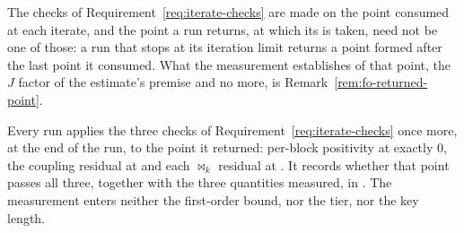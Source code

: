 
The checks of Requirement~\ref{req:iterate-checks} are made on the point
consumed at each iterate, and the point a run returns, at which its
 is taken, need not be one of those: a run that stops at its
iteration limit returns a point formed after the last point it consumed.
What the measurement establishes of that point, the $J$ factor of the
estimate's premise and no more, is Remark~\ref{rem:fo-returned-point}.

\begin{requirement}\label{req:returned-point-measured}
Every run applies the three checks of Requirement~\ref{req:iterate-checks}
once more, at the end of the run, to the point it returned: per-block
positivity at exactly $0$, the coupling residual at 
and each $\bowtie_k$ residual at . It records whether
that point passes all three, together with the three quantities measured,
in . The measurement enters neither the
first-order bound, nor the tier, nor the key length.
\end{requirement}
